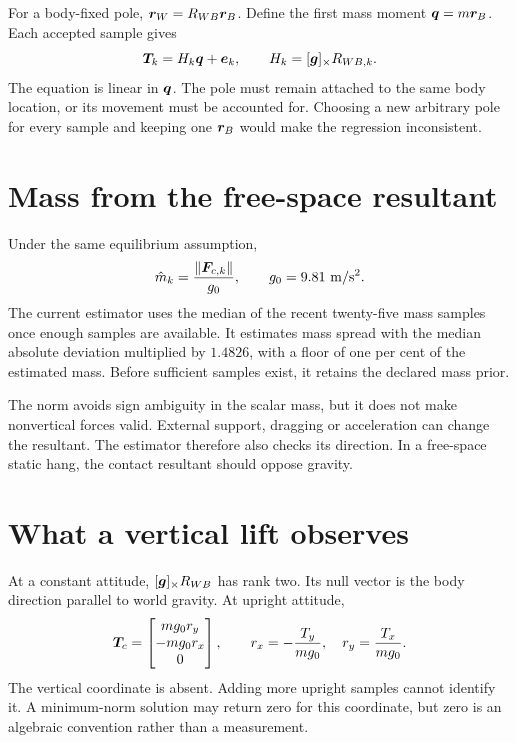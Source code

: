 For a body-fixed pole, $\bm{r}_W=R_{WB}\bm{r}_B$. Define the first mass moment $\bm{q}=m\bm{r}_B$. Each accepted sample gives
\begin{equation}
\bm{T}_k=H_k\bm{q}+\bm{e}_k,\qquad
H_k=[\bm{g}]_{\times}R_{WB,k}.
\label{eq:regression}
\end{equation}
The equation is linear in $\bm{q}$. The pole must remain attached to the same body location, or its movement must be accounted for. Choosing a new arbitrary pole for every sample and keeping one $\bm{r}_B$ would make the regression inconsistent.

\section{Mass from the free-space resultant}

Under the same equilibrium assumption,
\begin{equation}
\hat m_k=\frac{\left\lVert\bm{F}_{c,k}\right\rVert}{g_0},\qquad g_0=9.81\ \mathrm{m/s^2}.
\end{equation}
The current estimator uses the median of the recent twenty-five mass samples once enough samples are available. It estimates mass spread with the median absolute deviation multiplied by $1.4826$, with a floor of one per cent of the estimated mass. Before sufficient samples exist, it retains the declared mass prior.

The norm avoids sign ambiguity in the scalar mass, but it does not make nonvertical forces valid. External support, dragging or acceleration can change the resultant. The estimator therefore also checks its direction. In a free-space static hang, the contact resultant should oppose gravity.

\section{What a vertical lift observes}

At a constant attitude, $[\bm{g}]_{\times}R_{WB}$ has rank two. Its null vector is the body direction parallel to world gravity. At upright attitude,
\begin{equation}
\bm{T}_c=\begin{bmatrix}mg_0 r_y\\-mg_0 r_x\\0\end{bmatrix},\qquad
r_x=-\frac{T_y}{mg_0},\quad r_y=\frac{T_x}{mg_0}.
\label{eq:planar-estimate}
\end{equation}
The vertical coordinate is absent. Adding more upright samples cannot identify it. A minimum-norm solution may return zero for this coordinate, but zero is an algebraic convention rather than a measurement.

